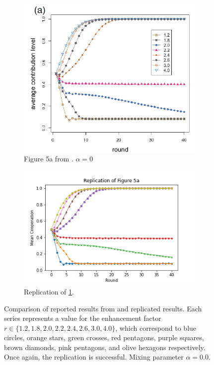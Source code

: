 \FloatBarrier
\begin{figure}[!h] 
  \begin{subfigure}[b]{0.45\textwidth}
    \includegraphics[width=\textwidth]{images/TAfig4a_real.png}
    \caption{Figure 5a from \cite{RN49}. $\alpha = 0$ }
    \label{TAfig4a_real}
  \end{subfigure}
  \hfill
  \begin{subfigure}[b]{0.45\textwidth}
    \includegraphics[width=1.35\textwidth]{images/TAfig4a.png}
    \caption{Replication of \ref{TAfig4a_real}. }
    \label{TAfig4a}
  \end{subfigure}
  \caption{Comparison of reported results from \cite{RN49} and replicated results. Each series represents a value for the enhancement factor $r \in \{1.2, 1.8, 2.0, 2.2, 2.4, 2.6, 3.0, 4.0\}$, which correspond to blue circles, orange stars, green crosses, red pentagons, purple squares, brown diamonds, pink pentagons, and olive hexagons respectively. Once again, the replication is successful.  Mixing parameter $\alpha = 0.0$. } \label{comp1}
\end{figure} 
\FloatBarrier




